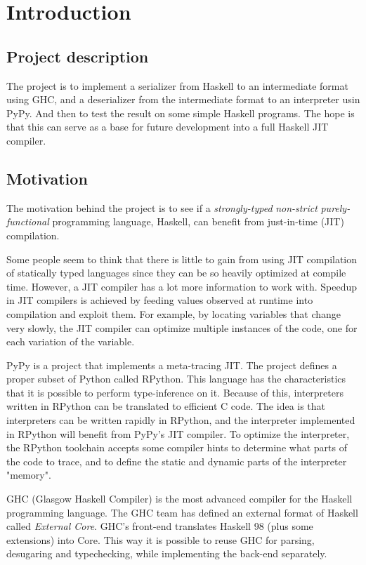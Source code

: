 
\section{Introduction}

\subsection{Project description}

The project is to implement a serializer from Haskell to an intermediate
format using GHC, and a deserializer from the intermediate format to an
interpreter usin PyPy. And then to test the result on some simple Haskell
programs. The hope is that this can serve as a base for future development
into a full Haskell JIT compiler.

\subsection{Motivation}

The motivation behind the project is to see if a \emph{strongly-typed} 
\emph{non-strict} \emph{purely-functional} programming language, Haskell, 
can benefit from just-in-time (JIT) compilation.

Some people seem to think that there is little to gain from using 
JIT compilation of statically typed languages since they can be
so heavily optimized at compile time. However, a JIT compiler has a lot
more information to work with. Speedup in JIT compilers is achieved by
feeding values observed at runtime into compilation and exploit them.
For example, by locating variables that change very slowly, the JIT compiler can
optimize multiple instances of the code, one for each variation of the
variable. \cite{bolz2011runtime}

PyPy is a project that implements a meta-tracing JIT. The project
defines a proper subset of Python called RPython. This language has 
the characteristics that it is possible to perform type-inference on it.
Because of this, interpreters written in RPython can be translated to
efficient C code.
The idea is that interpreters can be written rapidly in RPython, and the
interpreter implemented in RPython will benefit from PyPy's JIT compiler.
To optimize the interpreter, the RPython toolchain accepts some compiler
hints to determine what parts of the code to trace, and to define the 
static and dynamic parts of the interpreter "memory". \cite{bolz2011runtime}

GHC (Glasgow Haskell Compiler) is the most advanced compiler for the
Haskell programming language. The GHC team has defined an external format
of Haskell called \emph{External Core}. GHC's front-end translates
Haskell 98 (plus some extensions) into Core. This way it is possible to
reuse GHC for parsing, desugaring and typechecking, while implementing
the back-end separately. \cite{tolmach2010ghc}

